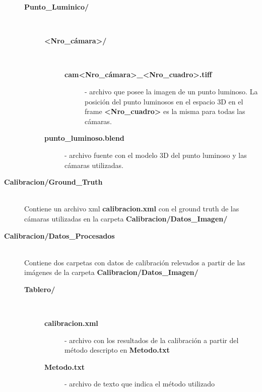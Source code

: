 \begin{description}
\begin{description}
   		 	
			\item[{\small\textbf{\textsf{Punto\_Luminico/}}}]  \hfill \\ \vspace{-0.5cm} 
			\begin{description}
					\item[{\small\textbf{\textsf{<Nro\_cámara>/}}}] \hfill \\ \vspace{-0.5cm}
					\begin{description}
							\item[{\small\textbf{\textsf{cam<Nro\_cámara>\_<Nro\_cuadro>.tiff}}}] - archivo que posee la imagen de un punto luminoso. La posición del punto luminosos en el espacio 3D en el frame {\small\textbf{\textsf{<Nro\_cuadro>}}} es la misma para todas las cámaras.
					\end{description} 
					\item[{\small\textbf{\textsf{punto\_luminoso.blend}}}] - archivo fuente con el modelo 3D del punto luminoso y las cámaras utilizadas.						 
			\end{description}
	\end{description} 	
 
\item[{\small\textbf{\textsf{Calibracion/Ground\_Truth}}}] \hfill \\
Contiene un archivo xml {\small\textbf{\textsf{calibracion.xml}}} con el ground truth de las cámaras utilizadas en la carpeta {\small\textbf{\textsf{Calibracion/Datos\_Imagen/}}}
\item[{\small\textbf{\textsf{Calibracion/Datos\_Procesados}}}] \hfill \\
Contiene dos carpetas con datos de calibración relevados a partir de las imágenes de la carpeta {\small\textbf{\textsf{Calibracion/Datos\_Imagen/}}}
	\begin{description}
	\item[{\small\textbf{\textsf{Tablero/}}}] \hfill \\ \vspace{-0.5cm}
						\begin{description}
								\item[{\small\textbf{\textsf{calibracion.xml}}}] - archivo con los resultados de la calibración a partir del método descripto en {\small\textbf{\textsf{Metodo.txt}}}
								\item[{\small\textbf{\textsf{Metodo.txt}}}] - archivo de texto que indica el método utilizado
								

\end{description}
\end{description}
\end{description}
